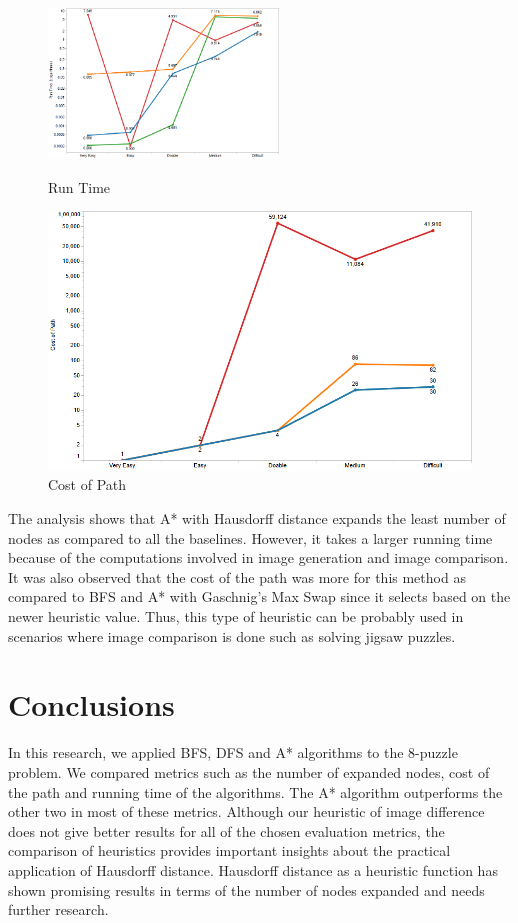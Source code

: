 \documentclass{svproc}
\begin{document}
\setlength{\intextsep}{5pt}
\begin{figure}
	\centering
	\begin{minipage}[b]{0.47\textwidth}
		\includegraphics[width=\textwidth, height=4cm]{Images/RunningTime.png}
		\caption{Run Time}
		\label{fig:time}
	\end{minipage}
	\begin{minipage}[b]{0.47\textwidth}
		\includegraphics[width=\textwidth]{Images/costofpath.png}
		\caption{Cost of Path}
		\label{fig:cost}
	\end{minipage}\hfill
\end{figure}

\noindent  The analysis shows that A* with Hausdorff distance expands the least number of nodes as compared to all the baselines. However, it takes a larger running time because of the computations involved in image generation and image comparison. It was also observed that the cost of the path was more for this method as compared to BFS and A* with Gaschnig's Max Swap since it selects based on the newer heuristic value. Thus, this type of heuristic can be probably used in scenarios where image comparison is done such as solving jigsaw puzzles.

\section{Conclusions}
In this research, we applied BFS, DFS and A* algorithms to the 8-puzzle problem. We compared metrics such as the number of expanded nodes, cost of the path and running time of the algorithms. The A* algorithm outperforms the other two in most of these metrics. Although our heuristic of image difference does not give better results for all of the chosen evaluation metrics, the comparison of heuristics provides important insights about the practical application of Hausdorff distance. Hausdorff distance as a heuristic function has shown promising results in terms of the number of nodes expanded and needs further research.
\end{document}
